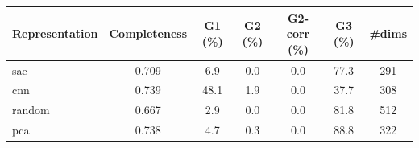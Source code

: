 \begin{tabular}{lcccccc}
\toprule
Representation & Completeness & G1 (\%) & G2 (\%) & G2-corr (\%) & G3 (\%) & \#dims \\
\midrule
sae & 0.709 & 6.9 & 0.0 & 0.0 & 77.3 & 291 \\
cnn & 0.739 & 48.1 & 1.9 & 0.0 & 37.7 & 308 \\
random & 0.667 & 2.9 & 0.0 & 0.0 & 81.8 & 512 \\
pca & 0.738 & 4.7 & 0.3 & 0.0 & 88.8 & 322 \\
\bottomrule
\end{tabular}